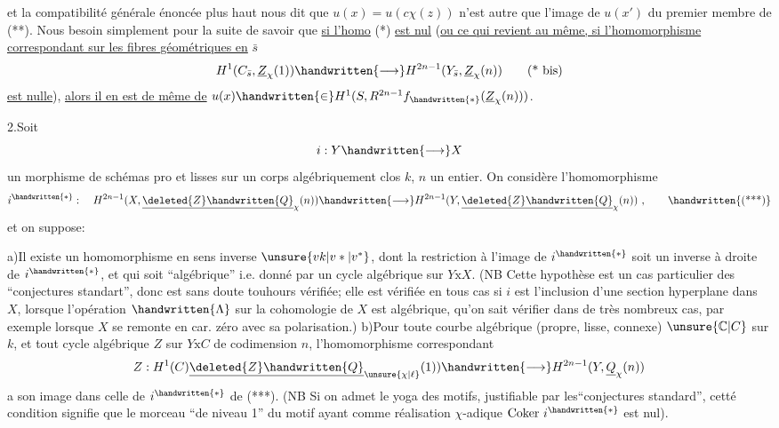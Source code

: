et la compatibilité générale énoncée plus haut nous dit que $u(x)=u(c\chi(z))$ n'est autre que l'image de $u(x')$ du premier membre de  (**). Nous  besoin simplement pour la suite de savoir que \uline{si l'homo} (*) \uline{est nul} (\uline{ou ce qui revient au même, si l'homomorphisme correspondant sur les fibres géométriques en} $\bar s$ 
\[
H^1(C_{\bar s},\underline{Z}_{\chi}(1))\handwritten{\longrightarrow}H^{2n-1}(Y_{\bar s},\underline{Z}_{\chi}(n))\tag*{(* bis)}
\]
\uline{est nulle}), \uline{alors il en est de même de} $u(x)\handwritten{\in}H^1(S,R^{2n-1}f_{\handwritten{*}}(\underline{Z}_{\chi}(n)))$.

2.\quad Soit
\[
i:Y\handwritten{\longrightarrow}X
\]
un morphisme de schémas pro et lisses sur un corps algébriquement clos $k$, $n$ un entier. On  considère l'homomorphisme
\[
i^{\handwritten{*}}:\quad H^{2n-1}(X,\underline{\deleted{Z}\handwritten{Q}}_{\chi}(n))\handwritten{\longrightarrow}H^{2n-1}(Y,\underline{\deleted{Z}\handwritten{Q}}_{\chi}(n))\ ,\tag*{\handwritten{(***)}}
\]
et on suppose:

a)\quad Il existe un homomorphisme en sens inverse $\unsure{vk|v*|v^*}$, dont la restriction à l'image de $i^{\handwritten{*}}$ soit un inverse à droite de $i^{\handwritten{*}}$, et qui soit ``algébrique'' i.e. donné par un cycle algébrique sur $Y\mathbin{\mathrm{x}}X$. (NB Cette hypothèse est un cas particulier des ``conjectures standart'', donc est sans doute touhours vérifiée; elle est vérifiée en tous cas si $i$ est l'inclusion d'une section hyperplane dans $X$, lorsque l'opération $\handwritten{\Lambda}$ sur  la cohomologie de $X$ est algébrique,   qu'on sait vérifier dans de très nombreux cas, par exemple lorsque $X$ se remonte en car. zéro avec sa polarisation.)
b)\quad Pour toute courbe algébrique (propre, lisse, connexe) $\unsure{\mathbb{C}|C}$ sur $k$, et tout cycle algébrique $Z$ sur $Y\mathbin{\mathrm{x}}C$ de codimension $n$, l'homomorphisme correspondant
\[
Z:H^1(C)\underline{\deleted{Z}\handwritten{Q}}_{\unsure{\chi|\ell}}(1))\handwritten{\longrightarrow}H^{2n-1}(Y,\underline{Q}_{\chi}(n))
\]
a son image dans celle de $i^{\handwritten{*}}$ de (***). (NB Si on admet le yoga des motifs, justifiable par les``conjectures standard'', cetté condition signifie que le  morceau  ``de niveau 1'' du motif  ayant comme réalisation $\chi$-adique $\mathrm{Coker}\ i^{\handwritten{*}}$ est nul).

